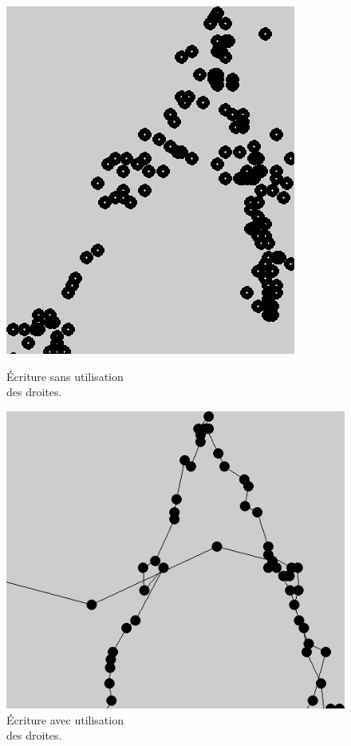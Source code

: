 \documentclass[12pt,a4paper,oneside]{book}
\begin{document}
	\begin{figure}[H]
		\begin{minipage}[H]{0.5\linewidth}
			\centering
			\includegraphics[scale=0.98]{images/avantp.jpg}
			\caption{Écriture sans utilisation \\des droites.}
			\label{fig19}
		\end{minipage}
		\begin{minipage}[H]{0.5\linewidth}
			\centering
			\includegraphics[scale=0.98]{images/apresp.jpg}
			\caption{Écriture avec utilisation \\des droites.}
			\label{fig20}
		\end{minipage}
	\end{figure}
	
\end{document}

